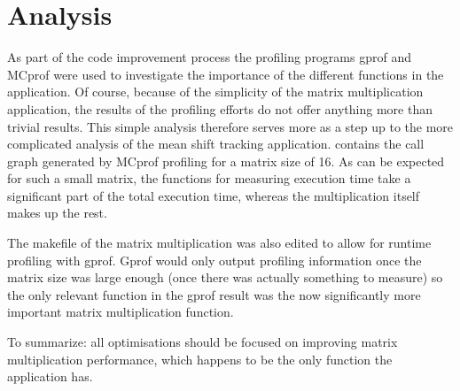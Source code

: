 \documentclass[final]{article}
\begin{document}
\section{Analysis}
As part of the code improvement process the profiling programs gprof and MCprof were used to investigate the importance of the different functions in the application.
Of course, because of the simplicity of the matrix multiplication application, the results of the profiling efforts do not offer anything more than trivial results.
This simple analysis therefore serves more as a step up to the more complicated analysis of the mean shift tracking application.
 contains the call graph generated by MCprof profiling for a matrix size of 16.
As can be expected for such a small matrix, the functions for measuring execution time take a significant part of the total execution time, whereas the multiplication itself makes up the rest.

The makefile of the matrix multiplication was also edited to allow for runtime profiling with gprof.
Gprof would only output profiling information once the matrix size was large enough (once there was actually something to measure) so the only relevant function in the gprof result was the now significantly more important matrix multiplication function.

To summarize: all optimisations should be focused on improving matrix multiplication performance, which happens to be the only function the application has.
\end{document}
